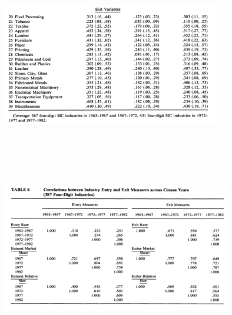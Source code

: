 \documentclass[dvipdfmx,14pt]{beamer}
\begin{document}
\begin{frame}

\begin{center}

\includegraphics[width=9.5cm,height=7.75cm]{DRS_T5b.pdf}

\end{center}

\end{frame}

\begin{frame}

\begin{center}

\includegraphics[width=10cm,height=7.75cm]{DRS_T6.pdf}

\end{center}

\end{frame}
\end{document}

